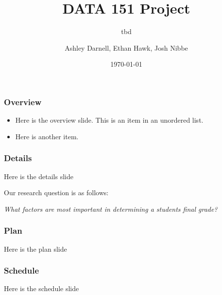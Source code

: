 \documentclass{beamer}
\title{DATA 151 Project}
\subtitle{tbd}
\author{Ashley Darnell, Ethan Hawk, Josh Nibbe}
\institute{Valparaiso Unviersity}
\date{\today}
\begin{document}
\begin{frame}
\titlepage
\end{frame}


\begin{frame}
\frametitle{Overview}
  \begin{itemize}
    \item Here is the overview slide. This is an item in an unordered list.

    \item Here is another item.
  \end{itemize}
\end{frame}


\begin{frame}
\frametitle{Details}
Here is the details slide

Our research question is as follows:

  \begin{center}
    \textit{What factors are most important in determining a students final grade?}
  \end{center}

\end{frame}


\begin{frame}
\frametitle{Plan}
Here is the plan slide
\end{frame}

\begin{frame}
\frametitle{Schedule}
Here is the schedule slide
\end{frame}
\end{document}
